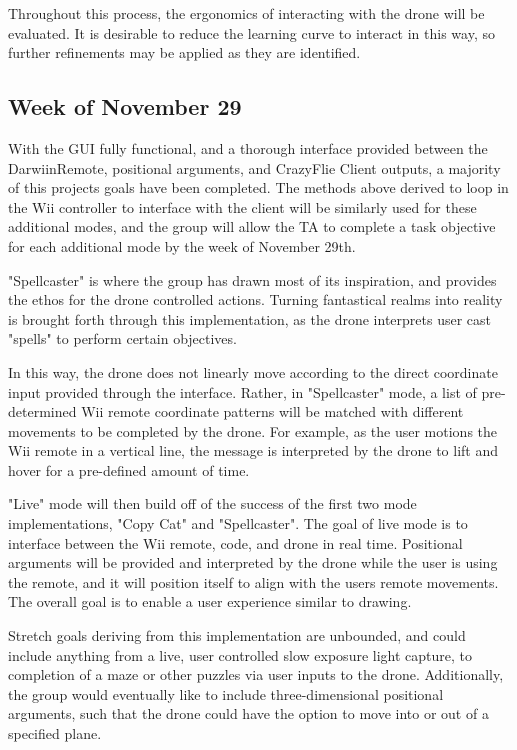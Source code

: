 \documentclass[conf]{new-aiaa}
\begin{document}
    Throughout this process, the ergonomics of interacting with the drone will be evaluated. It is desirable to reduce the learning curve to interact in this way, so further refinements may be applied as they are identified.
    
    
    \subsection{Week of November 29}
    
     With the GUI fully functional, and a thorough interface provided between the DarwiinRemote, positional arguments, and CrazyFlie Client outputs, a majority of this projects goals have been completed. The methods above derived to loop in the Wii controller to interface with the client will be similarly used for these additional modes, and the group will allow the TA to complete a task objective for each additional mode by the week of November 29th.
    
    "Spellcaster" is where the group has drawn most of its inspiration, and provides the ethos for the drone controlled actions. Turning fantastical realms into reality is brought forth through this implementation, as the drone interprets user cast "spells" to perform certain objectives.
    
    In this way, the drone does not linearly move according to the direct coordinate input provided through the interface. Rather, in "Spellcaster" mode, a list of pre-determined Wii remote coordinate patterns will be matched with different movements to be completed by the drone. For example, as the user motions the Wii remote in a vertical line, the message is interpreted by the drone to lift and hover for a pre-defined amount of time.
    
    "Live" mode will then build off of the success of the first two mode implementations, "Copy Cat" and "Spellcaster". The goal of live mode is to interface between the Wii remote, code, and drone in real time. Positional arguments will be provided and interpreted by the drone while the user is using the remote, and it will position itself to align with the users remote movements. The overall goal is to enable a user experience similar to drawing. 
    
    Stretch goals deriving from this implementation are unbounded, and could include anything from a live, user controlled slow exposure light capture, to completion of a maze or other puzzles via user inputs to the drone. Additionally, the group would eventually like to include three-dimensional positional arguments, such that the drone could have the option to move into or out of a specified plane.
    
\end{document}
